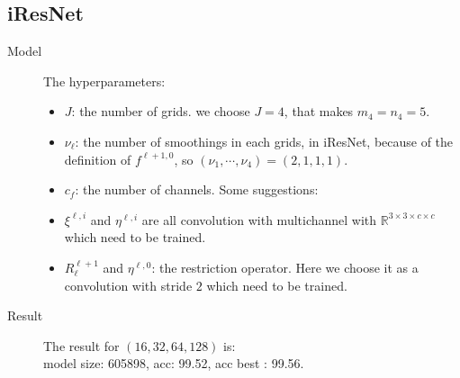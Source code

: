 \subsection{iResNet}
\begin{description}
	\item[Model] The hyperparameters:
	\begin{itemize}
	\item $J$: the number of grids. we choose $J = 4$, that makes $m_4 = n_4 = 5$.
\item $\nu_\ell$:  the number of smoothings in each grids, 
in iResNet, because of the definition of $f^{\ell+1,0}$, so $(\nu_1, \cdots, \nu_{4}) = (2,1,1,1)$.
\item $c_f$: the number of channels.  Some suggestions:
\item $\xi^{\ell,i} $ and $\eta^{\ell,i} $ are all convolution with multichannel with 
$\mathbb{R}^{3\times3\times c\times c}$
which need to be trained.
\item $R_{\ell}^{\ell+1}$ and $\eta^{\ell,0}$: the restriction operator. 
Here we choose it as a convolution with stride $2$ which need to be trained.
	\end{itemize}
	
	\item[Result] The result for $(16,32, 64, 128)$ is: \\
	model size: 605898,  acc: 99.52,  acc best : 99.56.
	
\end{description}